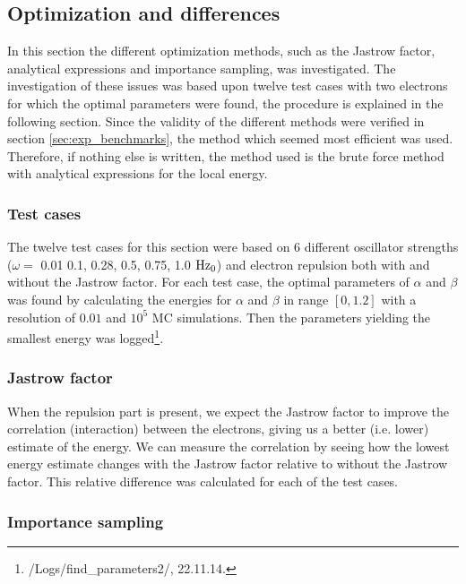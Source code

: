 \subsection{Optimization and differences} \label{sec:exp_opt_and_diff}

In this section the different optimization methods, such as the Jastrow factor, analytical expressions and importance sampling, was investigated. 
The investigation of these issues was based upon twelve test cases with two electrons for which the optimal parameters were found, the procedure is explained in the following section.
Since the validity of the different methods were verified in section \ref{sec:exp_benchmarks}, the method which seemed most efficient was used. Therefore, if nothing else is written, the method used is the brute force method with analytical expressions for the local energy. 

\subsubsection{Test cases}\label{sec:exp_test_cases}

The twelve test cases for this section were based on 6 different oscillator strengths ($\omega =$ 0.01 0.1, 0.28, 0.5, 0.75, 1.0$~\textrm{Hz}_0$) and electron repulsion both with and without the Jastrow factor.
For each test case, the optimal parameters of $\alpha$ and $\beta$ was found by calculating the energies for $\alpha$ and $\beta$ in range $[0,1.2]$ with a resolution of $0.01$ and $10^5$ MC simulations.
Then the parameters yielding the smallest energy was logged\footnote{/Logs/find\_parameters2/, 22.11.14.}. 

\subsubsection{Jastrow factor}

When the repulsion part is present, we expect the Jastrow factor to improve the correlation (interaction) between the electrons, giving us a better (i.e. lower) estimate of the energy. 
We can measure the correlation by seeing how the lowest energy estimate changes with the Jastrow factor relative to without the Jastrow factor. 
This relative difference was calculated for each of the test cases. 

\subsubsection{Importance sampling}

